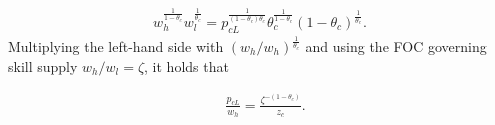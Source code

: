 \begin{align*}
	w_{h}^{\frac{1}{1-\theta_c}}w_l^{\frac{1}{\theta_c}}= p_{cL}^\frac{1}{(1-\theta_c)\theta_c}\theta_c^\frac{1}{1-\theta_c}(1-\theta_c)^\frac{1}{\theta_c}.
\end{align*}
Multiplying the left-hand side with $(w_h/w_h)^\frac{1}{\theta_c}$ and
using the FOC governing skill supply $w_h/w_l=\zeta$, it holds that

\begin{align}\label{eq:constant}
& \frac{p_{cL}}{w_h}= \frac{\zeta^{-(1-\theta_c)}}{z_c}.
\end{align}

